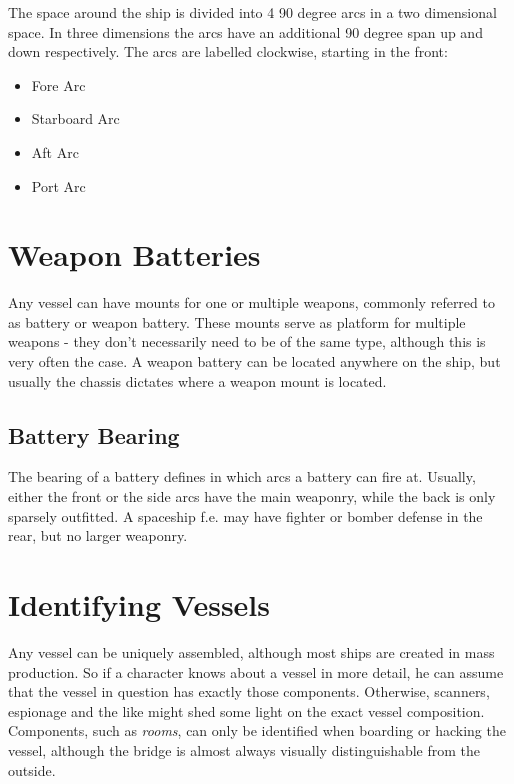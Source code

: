 The space around the ship is divided into 4 90 degree arcs in a two dimensional space. In three dimensions the arcs have an additional 90 degree span up and down respectively. The arcs are labelled clockwise, starting in the front:

\begin{itemize}
  \item Fore Arc
  \item Starboard Arc
  \item Aft Arc
  \item Port Arc
\end{itemize}

\section{Weapon Batteries}
\label{sec:Vessels-Weapon-Batteries}

Any vessel can have mounts for one or multiple weapons, commonly referred to as battery or weapon battery. These mounts serve as platform for multiple weapons - they don't necessarily need to be of the same type, although this is very often the case. A weapon battery can be located anywhere on the ship, but usually the chassis dictates where a weapon mount is located.

\subsection{Battery Bearing}
\label{sub:Vessels-Battery-Bearing}

The bearing of a battery defines in which arcs a battery can fire at. Usually, either the front or the side arcs have the main weaponry, while the back is only sparsely outfitted. A spaceship f.e. may have fighter or bomber defense in the rear, but no larger weaponry.

\section{Identifying Vessels}
\label{sec:Vessels-Identifying Vessels}

Any vessel can be uniquely assembled, although most ships are created in mass production. So if a character knows about a vessel in more detail, he can assume that the vessel in question has exactly those components. Otherwise, scanners, espionage and the like might shed some light on the exact vessel composition. Components, such as \emph{rooms}, can only be identified when boarding or hacking the vessel, although the bridge is almost always visually distinguishable from the outside.

